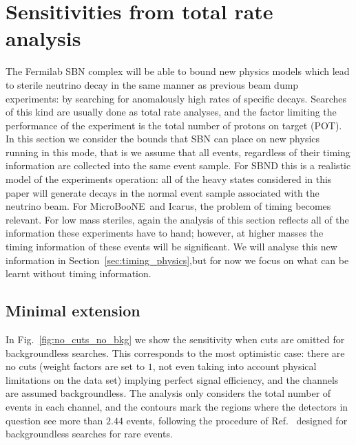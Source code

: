 \documentclass[11pt, a4paper]{article}
\newcommand{\reffig}[1]{Fig.~\ref{#1}}
\newcommand{\refsec}[1]{Section~\ref{#1}}
\newcommand{\refref}[1]{Ref.~\cite{#1}}
\def\muboone{MicroBooNE}
\begin{document}
\section{Sensitivities from total rate analysis\label{sec:sensitivity}}

The Fermilab SBN complex will be able to bound new physics models which lead to
sterile neutrino decay in the same manner as previous beam dump experiments: by
searching for anomalously high rates of specific decays. Searches of this kind
are usually done as total rate analyses, and the factor limiting the
performance  of the experiment is the total number of protons on target (POT).
In this section we consider the bounds that SBN can place on new physics
running in this mode, that is we assume that all events, regardless of their
timing information are collected into the same event sample. For SBND this is a
realistic model of the experiments operation: all of the heavy states
considered in this paper will generate decays in the normal event sample
associated with the neutrino beam. For \muboone\ and Icarus, the problem of
timing becomes relevant.  For low mass steriles, again the analysis of this
section reflects all of the information these experiments have to hand;
however, at higher masses the timing information of these events will be
significant. We will analyse this new information in
\refsec{sec:timing_physics},but for now we focus on what can be learnt without
timing information.

\subsection{Minimal extension}

In \reffig{fig:no_cuts_no_bkg} we show the sensitivity when cuts are omitted
for backgroundless searches. This corresponds to the most optimistic case:
there are no cuts (weight factors are set to $1$, not even taking into account
physical limitations on the data set) implying perfect signal efficiency, and
the channels are assumed backgroundless.
%
The analysis only considers the total number of events in each channel, and the
contours mark the regions where the detectors in question see more than $2.44$
events, following the procedure of \refref{Feldman:1997qc} designed for
backgroundless searches for rare events. 
\end{document}
